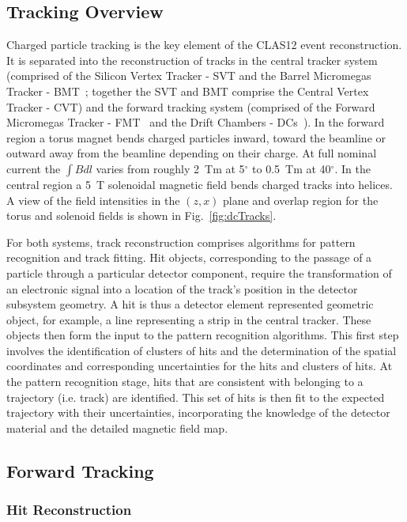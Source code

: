 \subsection{Tracking Overview}

Charged particle tracking is the key element of the CLAS12 event reconstruction. It is separated into the
reconstruction of tracks in the central tracker system (comprised of the Silicon Vertex Tracker - SVT
\cite{svt-nim} and the Barrel Micromegas Tracker - BMT~\cite{mm-nim}; together the SVT and BMT comprise
the Central Vertex Tracker - CVT)  and the forward tracking system (comprised of the Forward Micromegas
Tracker - FMT~\cite{mm-nim} and the Drift Chambers - DCs~\cite{dc-nim}). In the forward region a torus magnet bends charged particles inward, toward
the beamline or outward away from the beamline depending on their charge. At full nominal current the $\int B dl$
varies from roughly 2~Tm at 5$^\circ$ to 0.5~Tm at 40$^\circ$. In the central region a 5~T solenoidal magnetic
field bends charged tracks into helices. A view of the field intensities in the $(z,x)$ plane and overlap region for
the torus and solenoid fields is shown in Fig.~\ref{fig:dcTracks}.

For both systems, track reconstruction comprises algorithms for pattern recognition and track fitting. Hit objects,
corresponding to the passage of a particle through a particular detector component, require the transformation of
an electronic signal into a location of the track's position in the detector subsystem geometry. A hit is thus a detector element represented
geometric object, for example, a line representing a strip in the central tracker. These objects then form the input to the pattern recognition
algorithms. This first step involves the identification of clusters of hits and the determination of the spatial
coordinates and corresponding uncertainties for the hits and clusters of hits. At the pattern recognition stage, hits
that are consistent with belonging to a trajectory (i.e. track) are identified. This set of hits is then fit to the
expected trajectory with their uncertainties, incorporating the knowledge of the detector material and the
detailed magnetic field map.

\subsection{Forward Tracking}

\subsubsection{Hit Reconstruction}
\label{sec:hitrecon}

